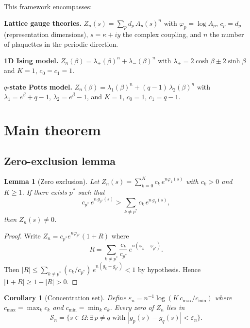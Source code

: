 \documentclass[12pt]{article}
\newtheorem{lemma}[theorem]{Lemma}
\newtheorem{corollary}[theorem]{Corollary}
\theoremstyle{definition}
\theoremstyle{remark}
\begin{document}
This framework encompasses:

\smallskip
\noindent\textbf{Lattice gauge theories.}
$Z_n(s) = \sum_p d_p\,A_p(s)^n$ with $\varphi_p = \log A_p$,
$c_p = d_p$ (representation dimensions), $s = \kappa + iy$ the
complex coupling, and $n$ the number of plaquettes in the periodic
direction.

\smallskip
\noindent\textbf{1D Ising model.}
$Z_n(\beta) = \lambda_+(\beta)^n + \lambda_-(\beta)^n$ with
$\lambda_\pm = 2\cosh\beta \pm 2\sinh\beta$ and $K = 1$, $c_0 = c_1 = 1$.

\smallskip
\noindent\textbf{$q$-state Potts model.}
$Z_n(\beta) = \lambda_1(\beta)^n + (q{-}1)\,\lambda_2(\beta)^n$ with
$\lambda_1 = e^\beta + q - 1$, $\lambda_2 = e^\beta - 1$, and
$K = 1$, $c_0 = 1$, $c_1 = q - 1$.


\section{Main theorem}
\label{sec:theorem}

\subsection{Zero-exclusion lemma}

\begin{lemma}[Zero exclusion]\label{lem:exclusion}
Let $Z_n(s) = \sum_{k=0}^K c_k\,e^{n\varphi_k(s)}$ with $c_k > 0$
and $K \geq 1$.  If there exists $p^*$ such that
\begin{equation}\label{eq:dominance}
c_{p^*}\,e^{n\,g_{p^*}(s)} > \sum_{k \neq p^*} c_k\,e^{n\,g_k(s)},
\end{equation}
then $Z_n(s) \neq 0$.
\end{lemma}

\begin{proof}
Write $Z_n = c_{p^*} e^{n\varphi_{p^*}} (1 + R)$ where
\[
R = \sum_{k \neq p^*} \frac{c_k}{c_{p^*}}\, e^{n(\varphi_k - \varphi_{p^*})}.
\]
Then $|R| \leq \sum_{k \neq p^*} (c_k/c_{p^*})\,e^{n(g_k - g_{p^*})}
< 1$ by hypothesis.  Hence $|1 + R| \geq 1 - |R| > 0$.
\end{proof}

\begin{corollary}[Concentration set]\label{cor:stokes}
Define $\varepsilon_n = n^{-1}\log(K\,c_{\max}/c_{\min})$ where
$c_{\max} = \max_k c_k$ and $c_{\min} = \min_k c_k$.  Every zero of
$Z_n$ lies in
\begin{equation}\label{eq:Sn}
\mathcal{S}_n = \bigl\{s \in \Omega : \exists\, p \neq q \text{ with }
|g_p(s) - g_q(s)| < \varepsilon_n\bigr\}.
\end{equation}
\end{corollary}
\end{document}
